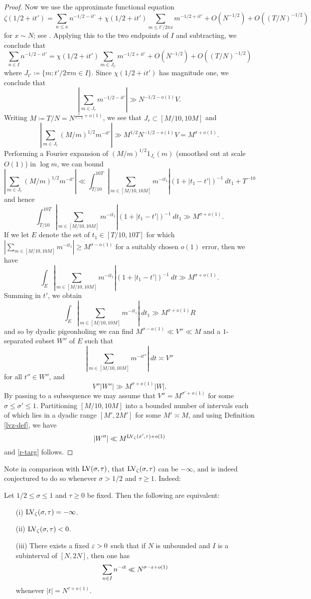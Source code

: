 \begin{proof}
Now we use the approximate functional equation
$$ \zeta(1/2+it') = \sum_{n \leq x} n^{-1/2-it'} + \chi(1/2+it') \sum_{m \leq t' / 2\pi x} m^{-1/2+it'} + O(N^{-1/2}) + O((T/N)^{-1/2})$$
for $x \sim N$; see \cite[Theorem 4.1]{ivic}.  Applying this to the two endpoints of $I$ and subtracting, we conclude that
$$ \sum_{n \in I} n^{-1/2-it'} =\chi(1/2+it') \sum_{m \in J_{t'}} m^{-1/2+it'} + O(N^{-1/2}) + O((T/N)^{-1/2})$$
where $J_{t'} \coloneqq \{ m: t' / 2\pi m \in I \}$. Since $\chi(1/2+it')$ has magnitude one, we conclude that
$$ |\sum_{m \in J_r} m^{-1/2-it'}| \gg N^{-1/2-o(1)} V.$$
Writing $M \coloneqq T/N = N^{\frac{1}{\tau-1}+o(1)}$, we see that $J_r \subset [M/10, 10M]$ and
$$ |\sum_{m \in J_r} (M/m)^{1/2} m^{-it'}| \gg M^{1/2} N^{-1/2-o(1)} V = M^{\sigma+o(1)}.$$
Performing a Fourier expansion of $(M/m)^{1/2} 1_{J_r}(m)$ (smoothed out at scale $O(1)$) in $\log m$, we can bound
$$ |\sum_{m \in J_r} (M/m)^{1/2} m^{-it'}| \ll \int_{T/10}^{10T} |\sum_{m \in [M/10,10M]} m^{-it_1}| (1 + |t_1-t'|)^{-1}\ dt_1 + T^{-10}$$
and hence
$$ \int_{T/10}^{10T} |\sum_{m \in [M/10,10M]} m^{-it_1}| (1 + |t_1-t'|)^{-1}\ dt_1  \gg M^{\sigma+o(1)}.$$
If we let $E$ denote the set of $t_1 \in [T/10, 10T]$ for which $|\sum_{m \in [M/10,10M]} m^{-it_1}| \geq M^{\sigma-o(1)}$ for a suitably chosen $o(1)$ error, then we have
$$ \int_E |\sum_{m \in [M/10,10M]} m^{-it_1}| (1 + |t_1-t'|)^{-1}\ dt  \gg M^{\sigma+o(1)}.$$
Summing in $t'$, we obtain
$$ \int_E |\sum_{m \in [M/10,10M]} m^{-it_1}|\ dt_1  \gg M^{\sigma+o(1)} R$$
and so by dyadic pigeonholing we can find $M^{\sigma-o(1)} \ll V'' \ll M$ and a $1$-separated subset $W''$ of $E$ such that
$$ |\sum_{m \in [M/10,10M]} m^{-it''}|\ dt \asymp V''$$
for all $t'' \in W''$, and
$$ V'' |W''| \gg M^{\sigma+o(1)} |W|.$$
By passing to a subsequence we may assume that $V'' = M^{\sigma'+o(1)}$ for some $\sigma \leq \sigma' \leq 1$. Partitioning $[M/10,10M]$ into a bounded number of intervals each of which lies in a dyadic range $[M',2M']$ for some $M' \asymp M$, and using Definition \ref{lvz-def}, we have
$$ |W''|  \ll M^{\mathrm{LV}_\zeta(\sigma',\tau)+o(1)}$$
and \eqref{r-targ} follows.
\end{proof}

Note in comparison with $\mathrm{LV}(\sigma,\tau)$, that $\mathrm{LV}_\zeta(\sigma,\tau)$ can be $-\infty$, and is indeed conjectured to do so whenever $\sigma>1/2$ and $\tau \geq 1$. Indeed:

\begin{lemma}\label{lvz-infty}  Let $1/2 \leq \sigma \leq 1$ and $\tau \geq 0$ be fixed. Then the following are equivalent:
\begin{itemize}
\item[(i)] $\mathrm{LV}_\zeta(\sigma,\tau)=-\infty$.
\item[(ii)] $\mathrm{LV}_\zeta(\sigma,\tau) < 0$.
\item[(iii)] There exists a fixed $\varepsilon>0$ such that if $N$ is unbounded and $I$ is a subinterval of $[N, 2N]$, then one has
$$ \sum_{n \in I} n^{-it} \ll N^{\sigma-\varepsilon+o(1)}$$
whenever $|t| = N^{\tau+o(1)}$.
\end{itemize}
\end{lemma}

